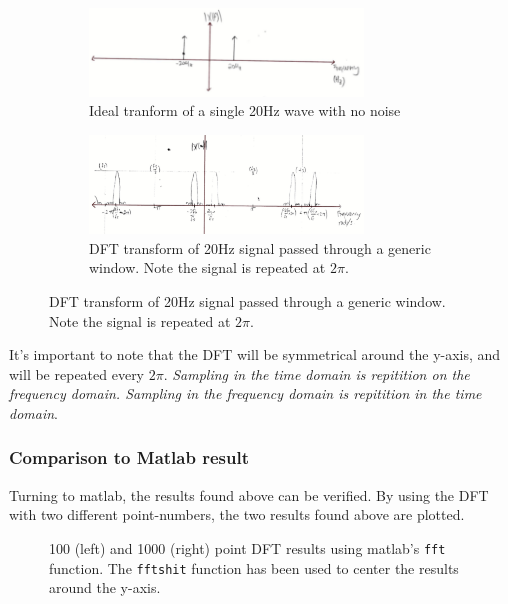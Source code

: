 \documentclass[main.tex]{subfiles}
\begin{document}
\begin{figure}[H]
	\centering
	\begin{subfigure}[b]{\textwidth}
		\centering
		\includegraphics[width=0.8\textwidth]{images/1-1-a-2.png}
		\caption{Ideal tranform of a single 20Hz wave with no noise}
		\label{fig:1-1-a-1}
	\end{subfigure}%
	
	\begin{subfigure}[b]{\textwidth}
		\centering
		\includegraphics[width=0.8\textwidth]{images/1-1-a.png}
		\caption{DFT transform of 20Hz signal passed through a generic window. Note the signal is repeated at $2\pi$. }
		\label{fig:1-1-a-2}
	\end{subfigure}%
\end{figure}

It's important to note that the DFT will be symmetrical around the y-axis, and will be repeated every $2\pi$. \textit{Sampling in the time domain is repitition on the frequency domain. Sampling in the frequency domain is repitition in the time domain}.


\subsubsection{Comparison to Matlab result}

Turning to matlab, the results found above can be verified. By using the DFT with two different point-numbers, the two results found above are plotted.

\begin{figure}[H]
	\centering 
	\resizebox{0.8\textwidth}{!}{}
	\caption{100 (left) and 1000 (right) point DFT results using matlab's {\tt fft} function. The {\tt fftshit} function has been used to center the results around the y-axis.}
	\label{fig:q1_1_b}
\end{figure}
\end{document}
